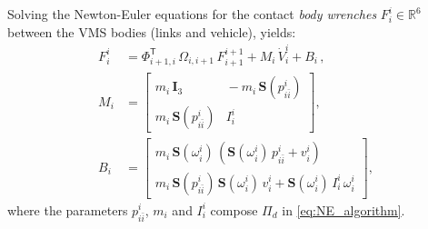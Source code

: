 \begin{algorithm}
\label{alg:backward_propagation}

%
Solving the Newton-Euler equations for the contact \textit{body wrenches} $F^{i}_{i} \in \mathbb{R}^{6}$ between the VMS bodies (links and vehicle), yields:
%
\begin{align}
F^{i}_{i} &= \Phi^\mathsf{T}_{i+1,i} \, \Omega_{i,i+1} \, F^{i+1}_{i+1} + M_{i} \, \dot{V}^{i}_{i} + B_{i} \,, \label{eq:backward_step} \\
%
M_{i} &= \left[\!\!\begin{array}{cc}
m_i \, \mathbf{I}_{3} \!\!\!&\!\!\! - m_i \, \mathbf{S}(p^{i}_{i\bar{i}}) \\
m_i \, \mathbf{S}(p^{i}_{i\bar{i}}) \!\!\!&\!\!\! I^{i}_{i}
\end{array}\!\!\right], \nonumber \\
%
B_{i} &= \left[\!\!\begin{array}{c}
m_i \, \mathbf{S}(\omega^{i}_{i}) \, ( \mathbf{S}(\omega^{i}_{i}) \, p^{i}_{i\bar{i}} + v^{i}_{i} ) \\
m_i \, \mathbf{S}(p^{i}_{i\bar{i}}) \, \mathbf{S}(\omega^{i}_{i}) \, v^{i}_{i} +
\mathbf{S}(\omega^{i}_{i}) \, I^{i}_{i} \, \omega^{i}_{i}
\end{array}\!\!\right], \nonumber
%
\end{align}
%
%
%
where the parameters $p^{i}_{i\bar{i}}$, $m_i$ and $I^i_i$ compose $\Pi_{d}$ in \eqref{eq:NE_algorithm}. 


\end{algorithm}
